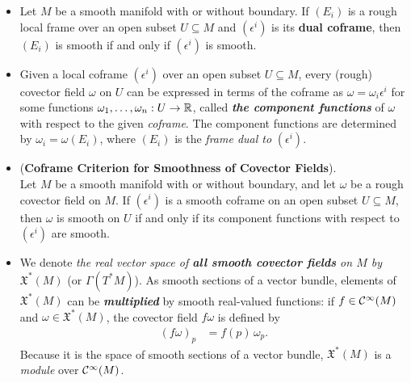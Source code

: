 \documentclass[11pt]{article}
\begin{document}
\begin{itemize}
\item \begin{lemma}
Let $M$ be a smooth manifold with or without boundary. If $(E_i)$ is a rough local frame over an open subset $U \subseteq M$ and $(\epsilon^{i})$ is its \textbf{dual coframe}, then $(E_i)$ is smooth if and only if $(\epsilon^{i})$ is smooth.
\end{lemma}

\item \begin{remark}
Given a local coframe  $(\epsilon^{i})$ over an open subset  $U \subseteq M$,  every (rough) covector field $\omega$ on $U$ can be expressed in terms of the coframe as $\omega = \omega_i \epsilon^i$ for some functions $\omega_1, \ldots, \omega_n: U \rightarrow {\mathbb R}$, called \emph{\textbf{the component functions}} of $\omega$ with respect
to the given \emph{coframe}. The component functions are determined by $\omega_i = \omega(E_i)$, where $(E_i)$ is the \emph{frame dual to} $(\epsilon^{i})$. 
\end{remark}

\item \begin{proposition}(\textbf{Coframe Criterion for Smoothness of Covector Fields}).\\
Let $M$ be a smooth manifold with or without boundary, and let $\omega$ be a rough covector field on $M$. If $(\epsilon^{i})$ is a smooth coframe on an open subset $U \subseteq M$, then $\omega$  is smooth on $U$ if and only if its component functions with respect to $(\epsilon^{i})$ are smooth.
\end{proposition}



\item \begin{remark}
We denote \emph{the real vector space of \textbf{all smooth covector fields} on $M$ by $\mathfrak{X}^{*}(M)$} (or $\Gamma(T^{*}M)$). As smooth sections of a vector bundle, elements of $\mathfrak{X}^{*}(M)$ can be \emph{\textbf{multiplied}} by smooth real-valued functions: if $f \in {\mathcal C}^{\infty}(M)$ and $\omega \in \mathfrak{X}^{*}(M)$, the covector field $f\omega$ is defined by
\begin{align}
(f\omega)_p &= f(p)\,\omega_{p}. \label{eqn: function_multiply_covector}
\end{align} Because it is the space of smooth sections of a vector bundle, $\mathfrak{X}^{*}(M)$ is a \emph{module} over  ${\mathcal C}^{\infty}(M)$.
\end{remark}


\end{itemize}
\end{document}
